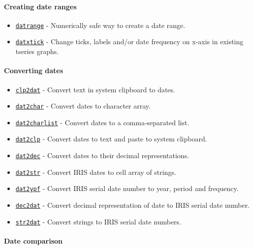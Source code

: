 \paragraph{Creating date ranges}

\begin{itemize}
\itemsep1pt\parskip0pt
\item
  \href{dates/datrange}{\texttt{datrange}} - Numerically safe way to
  create a date range.
\item
  \href{dates/datxtick}{\texttt{datxtick}} - Change ticks, labels and/or
  date frequency on x-axis in existing tseries graphs.
\end{itemize}

\paragraph{Converting dates}

\begin{itemize}
\itemsep1pt\parskip0pt
\item
  \href{dates/clp2dat}{\texttt{clp2dat}} - Convert text in system
  clipboard to dates.
\item
  \href{dates/dat2char}{\texttt{dat2char}} - Convert dates to character
  array.
\item
  \href{dates/dat2charlist}{\texttt{dat2charlist}} - Convert dates to a
  comma-separated list.
\item
  \href{dates/dat2clp}{\texttt{dat2clp}} - Convert dates to text and
  paste to system clipboard.
\item
  \href{dates/dat2dec}{\texttt{dat2dec}} - Convert dates to their
  decimal representations.
\item
  \href{dates/dat2str}{\texttt{dat2str}} - Convert IRIS dates to cell
  array of strings.
\item
  \href{dates/dat2ypf}{\texttt{dat2ypf}} - Convert IRIS serial date
  number to year, period and frequency.
\item
  \href{dates/dec2dat}{\texttt{dec2dat}} - Convert decimal
  representation of date to IRIS serial date number.
\item
  \href{dates/str2dat}{\texttt{str2dat}} - Convert strings to IRIS
  serial date numbers.
\end{itemize}

\paragraph{Date comparison}

